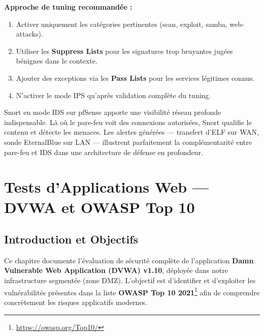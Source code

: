 \documentclass[12pt,a4paper,openany]{report}
\begin{document}
\textbf{Approche de tuning recommandée :}
\begin{enumerate}
    \item Activer uniquement les catégories pertinentes (scan, exploit, samba, web-attacks).
    \item Utiliser les \textbf{Suppress Lists} pour les signatures trop bruyantes jugées bénignes dans le contexte.
    \item Ajouter des exceptions via les \textbf{Pass Lists} pour les services légitimes connus.
    \item N'activer le mode IPS qu'après validation complète du tuning.
\end{enumerate}

\begin{tcolorbox}[colback=primary!5!white, colframe=primary, title=\textbf{Bilan du Chapitre 5}]
Snort en mode IDS sur pfSense apporte une visibilité réseau profonde indispensable. Là où le pare-feu
voit des connexions autorisées, Snort qualifie le contenu et détecte les menaces. Les alertes générées
--- transfert d'ELF sur WAN, sonde EternalBlue sur LAN --- illustrent parfaitement la complémentarité
entre pare-feu et IDS dans une architecture de défense en profondeur.
\end{tcolorbox}

\chapter{Tests d'Applications Web --- DVWA et OWASP Top 10}
\label{chap:dvwa}

\section{Introduction et Objectifs}

Ce chapitre documente l'évaluation de sécurité complète de l'application
\textbf{Damn Vulnerable Web Application (DVWA) v1.10}, déployée dans notre infrastructure segmentée
(zone DMZ). L'objectif est d'identifier et d'exploiter les vulnérabilités présentes dans la liste
\textbf{OWASP Top 10 2021}\footnote{\url{https://owasp.org/Top10/}} afin de comprendre concrètement les risques applicatifs modernes.
\end{document}
